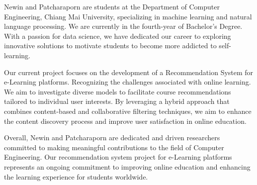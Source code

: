 \documentclass[final,isne,project]{cpecmu}
\begin{document}
\begin{biosketch}
\textsf{Newin and Patcharaporn are students at the Department of Computer 
Engineering, Chiang Mai University, specializing in machine learning 
and natural language processing. We are currently in the fourth-year 
of Bachelor's Degree. With a passion for data science, we have dedicated 
our career to exploring innovative solutions to motivate students to 
become more addicted to self-learning.}

\textsf{Our current project focuses on the development of a Recommendation 
System for e-Learning platforms. Recognizing the challenges associated 
with online learning. We aim to investigate diverse models to facilitate 
course recommendations tailored to individual user interests. By leveraging 
a hybrid approach that combines content-based and collaborative filtering 
techniques, we aim to enhance the content discovery process and improve user 
satisfaction in online education.}

\textsf{Overall, Newin and Patcharaporn are dedicated and driven researchers 
committed to making meaningful contributions to the field of Computer 
Engineering. Our recommendation system project for e-Learning 
platforms represents an ongoing commitment to improving online 
education and enhancing the learning experience for students worldwide.}
\end{biosketch}

\fi
\end{document}
